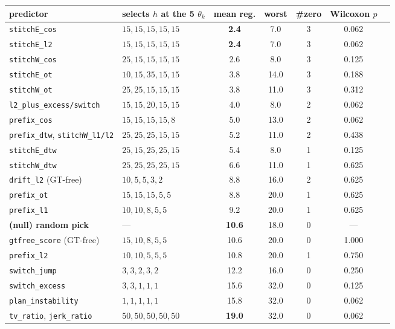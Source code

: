 \documentclass[11pt]{article}
\begin{document}
\begin{center}
\begin{tabular}{llccccc}
\toprule
predictor & selects $h$ at the 5 $\theta_k$ & mean reg. & worst & \#zero & Wilcoxon $p$\\
\midrule
\texttt{stitchE\_cos} & $15,15,15,15,15$ & \textbf{2.4} & 7.0 & 3 & 0.062\\
\texttt{stitchE\_l2}  & $15,15,15,15,15$ & \textbf{2.4} & 7.0 & 3 & 0.062\\
\texttt{stitchW\_cos} & $25,15,15,15,15$ & 2.6 & 8.0 & 3 & 0.125\\
\texttt{stitchE\_ot}  & $10,15,35,15,15$ & 3.8 & 14.0 & 3 & 0.188\\
\texttt{stitchW\_ot}  & $25,25,15,15,15$ & 3.8 & 11.0 & 3 & 0.312\\
\texttt{l2\_plus\_excess/switch} & $15,15,20,15,15$ & 4.0 & 8.0 & 2 & 0.062\\
\texttt{prefix\_cos} & $15,15,15,15,8$ & 5.0 & 13.0 & 2 & 0.062\\
\texttt{prefix\_dtw}, \texttt{stitchW\_l1/l2} & $25,25,25,15,15$ & 5.2 & 11.0 & 2 & 0.438\\
\texttt{stitchE\_dtw} & $25,15,25,25,15$ & 5.4 & 8.0 & 1 & 0.125\\
\texttt{stitchW\_dtw} & $25,25,25,25,15$ & 6.6 & 11.0 & 1 & 0.625\\
\midrule
\texttt{drift\_l2} (GT-free) & $10,5,5,3,2$ & 8.8 & 16.0 & 2 & 0.625\\
\texttt{prefix\_ot} & $15,15,15,5,5$ & 8.8 & 20.0 & 1 & 0.625\\
\texttt{prefix\_l1} & $10,10,8,5,5$ & 9.2 & 20.0 & 1 & 0.625\\
\textbf{(null) random pick} & --- & \textbf{10.6} & 18.0 & 0 & ---\\
\texttt{gtfree\_score} (GT-free) & $15,10,8,5,5$ & 10.6 & 20.0 & 0 & 1.000\\
\texttt{prefix\_l2} & $10,10,5,5,5$ & 10.8 & 20.0 & 1 & 0.750\\
\texttt{switch\_jump} & $3,3,2,3,2$ & 12.2 & 16.0 & 0 & 0.250\\
\texttt{switch\_excess} & $3,3,1,1,1$ & 15.6 & 32.0 & 0 & 0.125\\
\texttt{plan\_instability} & $1,1,1,1,1$ & 15.8 & 32.0 & 0 & 0.062\\
\texttt{tv\_ratio}, \texttt{jerk\_ratio} & $50,50,50,50,50$ & \textbf{19.0} & 32.0 & 0 & 0.062\\
\bottomrule
\end{tabular}
\end{center}
\end{document}
